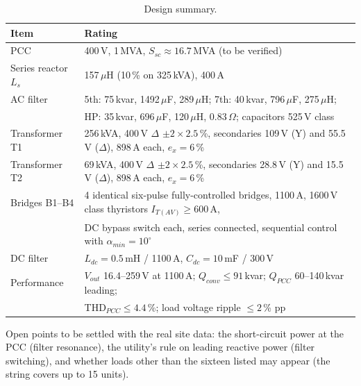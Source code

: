 \documentclass[11pt,a4paper]{article}
\newcommand{\ex}{e_x}
\begin{document}
\begin{table}[h]
\centering
\footnotesize
\begin{tabular}{lp{130mm}}
\toprule
Item & Rating\\
\midrule
PCC & 400\,V, 1\,MVA, $S_{sc} \approx 16.7$\,MVA (to be verified)\\
Series reactor $L_s$ & 157\,$\mu$H (10\,\% on 325\,kVA), 400\,A\\
AC filter & 5th: 75\,kvar, 1492\,$\mu$F, 289\,$\mu$H; 7th: 40\,kvar, 796\,$\mu$F, 275\,$\mu$H;\\
 & HP: 35\,kvar, 696\,$\mu$F, 120\,$\mu$H, 0.83\,$\Omega$; capacitors 525\,V class\\
Transformer T1 & 256\,kVA, 400\,V $\Delta$ $\pm2\times2.5$\,\%, secondaries 109\,V (Y) and 55.5\,V ($\Delta$), 898\,A each, $\ex = 6$\,\%\\
Transformer T2 & 69\,kVA, 400\,V $\Delta$ $\pm2\times2.5$\,\%, secondaries 28.8\,V (Y) and 15.5\,V ($\Delta$), 898\,A each, $\ex = 6$\,\%\\
Bridges B1--B4 & 4 identical six-pulse fully-controlled bridges, 1100\,A, 1600\,V class thyristors $I_{T(AV)} \ge 600$\,A,\\
 & DC bypass switch each, series connected, sequential control with $\alpha_{min} = 10^\circ$\\
DC filter & $L_{dc} = 0.5$\,mH / 1100\,A, $C_{dc} = 10$\,mF / 300\,V\\
Performance & $V_{out}$ 16.4--259\,V at 1100\,A; $Q_{conv} \le 91$\,kvar; $Q_{PCC}$ 60--140\,kvar leading;\\
 & THD$_{PCC} \le 4.4$\,\%; load voltage ripple $\le 2$\,\% pp\\
\bottomrule
\end{tabular}
\caption{Design summary.}
\end{table}

Open points to be settled with the real site data: the short-circuit power at the PCC (filter resonance), the utility's rule on leading reactive power (filter switching), and whether loads other than the sixteen listed may appear (the string covers up to 15 units).
\end{document}

